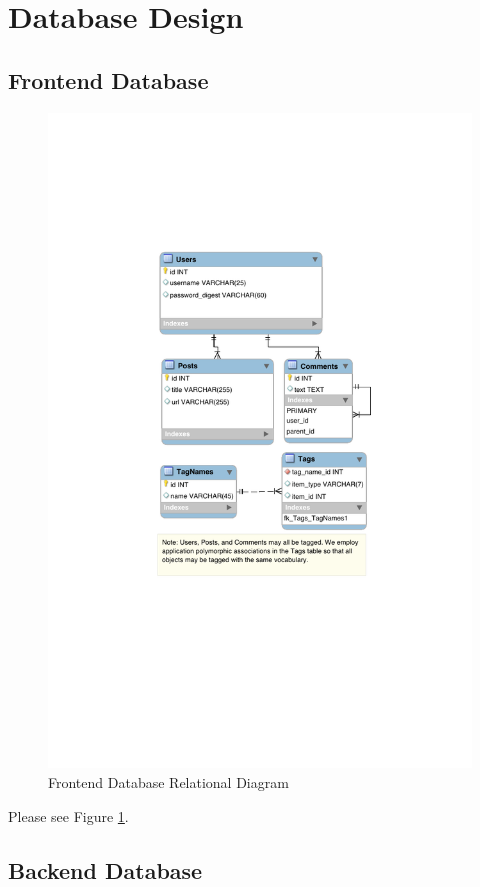 \documentclass[11pt,letterpaper]{article}
\begin{document}
\section{Database Design}
\subsection{Frontend Database}
\begin{figure}
\centering
\includegraphics{db_diagram.pdf}
\caption{Frontend Database Relational Diagram}
\label{fig:database}
\end{figure}
Please see Figure \ref{fig:database}.
\subsection{Backend Database}
\end{document}
